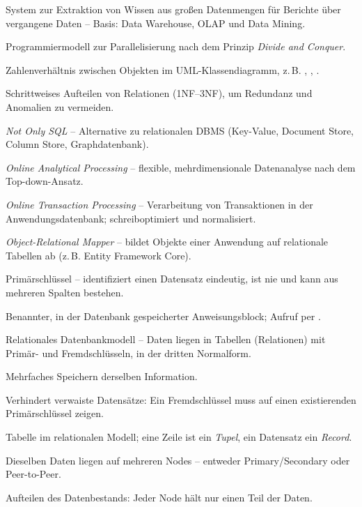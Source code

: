 \begin{description}[style=nextline, itemsep=2pt]
  \item[Managementunterstützungssystem] System zur Extraktion von Wissen aus großen Datenmengen für Berichte über vergangene Daten -- Basis: Data Warehouse, OLAP und Data Mining.
  \item[Map/Reduce] Programmiermodell zur Parallelisierung nach dem Prinzip \emph{Divide and Conquer}.
  \item[Multiplizität] Zahlenverhältnis zwischen Objekten im UML-Klassendiagramm, z.\,B. , , .
  \item[Normalisierung] Schrittweises Aufteilen von Relationen (1NF--3NF), um Redundanz und Anomalien zu vermeiden.
  \item[NoSQL] \emph{Not Only SQL} -- Alternative zu relationalen DBMS (Key-Value, Document Store, Column Store, Graphdatenbank).
  \item[OLAP] \emph{Online Analytical Processing} -- flexible, mehrdimensionale Datenanalyse nach dem Top-down-Ansatz.
  \item[OLTP] \emph{Online Transaction Processing} -- Verarbeitung von Transaktionen in der Anwendungsdatenbank; schreiboptimiert und normalisiert.
  \item[ORM] \emph{Object-Relational Mapper} -- bildet Objekte einer Anwendung auf relationale Tabellen ab (z.\,B. Entity Framework Core).
  \item[Primary Key] Primärschlüssel -- identifiziert einen Datensatz eindeutig, ist nie  und kann aus mehreren Spalten bestehen.
  \item[Prozedur] Benannter, in der Datenbank gespeicherter Anweisungsblock; Aufruf per .
  \item[RDM] Relationales Datenbankmodell -- Daten liegen in Tabellen (Relationen) mit Primär- und Fremdschlüsseln, in der dritten Normalform.
  \item[Redundanz] Mehrfaches Speichern derselben Information.
  \item[Referenzielle Integrität] Verhindert verwaiste Datensätze: Ein Fremdschlüssel muss auf einen existierenden Primärschlüssel zeigen.
  \item[Relation] Tabelle im relationalen Modell; eine Zeile ist ein \emph{Tupel}, ein Datensatz ein \emph{Record}.
  \item[Replikation] Dieselben Daten liegen auf mehreren Nodes -- entweder Primary/Secondary oder Peer-to-Peer.
  \item[Sharding] Aufteilen des Datenbestands: Jeder Node hält nur einen Teil der Daten.

\end{description}
